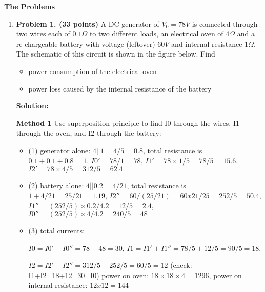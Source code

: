 {\bf The Problems}
\begin{enumerate}

\item {\bf Problem 1. (33 points)} 
A DC generator of $V_0=78V$ is connected through two wires each of 
$0.1\Omega$ to two different loads, an electrical oven of $4\Omega$ 
and a re-chargeable battery with voltage (leftover) $60V$ and internal 
resistance $1\Omega$. The schematic of this circuit is shown in the 
figure below. Find
\begin{itemize}
	\item power consumption of the electrical oven
	\item power loss caused by the internal resistance of the battery
\end{itemize}


{\bf Solution:}

{\bf Method 1} Use superposition principle to find I0 through the wires, 
I1 through the oven, and I2 through the battery:

\begin{itemize}
\item (1) generator alone: $4 || 1=4/5=0.8$, total resistance is 
	$0.1+0.1+0.8=1$, $I0'=78/1=78$, $I1'=78 \times 1/5=78/5=15.6$, 
	$I2'=78 \times 4/5=312/5=62.4$

\item (2) battery alone: $4 || 0.2=4/21$, total resistance is 
	$1+4/21=25/21=1.19$, $I2''=60/(25/21)=60x21/25=252/5=50.4$, 
	$I1''=(252/5) \times 0.2/4.2=12/5=2.4$,
 	$I0''=(252/5) \times 4/4.2=240/5=48$

\item (3) total currents:

 $I0=I0'-I0''=78-48=30$, $I1=I1'+I1''=78/5+12/5=90/5=18$, 

 $I2=I2'-I2''=312/5-252/5=60/5=12$ (check: I1+I2=18+12=30=I0)
 power on oven: $18\times 18\times 4=1296$, power on internal resistance: $12x12=144$

\end{itemize}


\end{enumerate}
